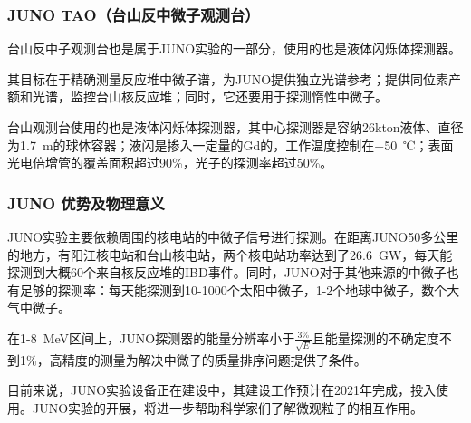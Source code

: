\documentclass[10pt,a4paper]{article}
\begin{document}
\subsubsection{JUNO TAO（台山反中微子观测台）}\label{sub:logicinter}

台山反中子观测台也是属于JUNO实验的一部分，使用的也是液体闪烁体探测器。

其目标在于精确测量反应堆中微子谱，为JUNO提供独立光谱参考；提供同位素产额和光谱，监控台山核反应堆；同时，它还要用于探测惰性中微子。

台山观测台使用的也是液体闪烁体探测器，其中心探测器是容纳26kton液体、直径为\SI{1.7}{m}的球体容器；液闪是掺入一定量的Gd的，工作温度控制在\SI{-50}{℃}；表面光电倍增管的覆盖面积超过90\%，光子的探测率超过50\%。


\subsubsection{JUNO 优势及物理意义}\label{sub:logicinter}

JUNO实验主要依赖周围的核电站的中微子信号进行探测。在距离JUNO50多公里的地方，有阳江核电站和台山核电站，两个核电站功率达到了\SI{26.6}{GW}，每天能探测到大概60个来自核反应堆的IBD事件。同时，JUNO对于其他来源的中微子也有足够的探测率：每天能探测到10-1000个太阳中微子，1-2个地球中微子，数个大气中微子。

在1-\SI{8 }{MeV}区间上，JUNO探测器的能量分辨率小于$\frac{3\%}{\sqrt{E}}$且能量探测的不确定度不到1\%，高精度的测量为解决中微子的质量排序问题提供了条件。

目前来说，JUNO实验设备正在建设中，其建设工作预计在2021年完成，投入使用。JUNO实验的开展，将进一步帮助科学家们了解微观粒子的相互作用。

\newpage
\end{document}
